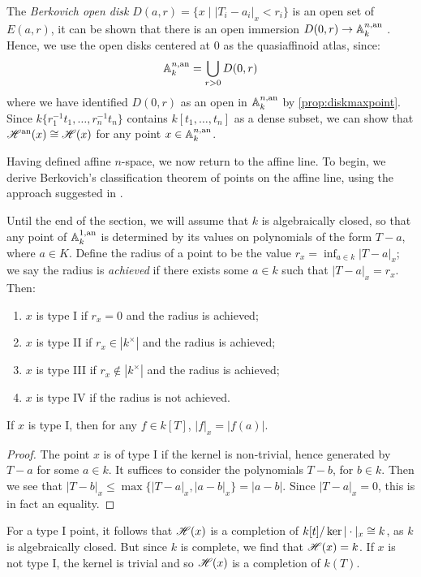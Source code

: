 The \textit{Berkovich open disk} $D(a, r) = \{x \; | \; |T_i - a_i|_x < r_i \}$ is an open set of $E(a, r)$, it can be shown that there is an open immersion $D(0, r) \to \mathbb{A}^{n, \text{an}}_{k}$ \parencite[Corollary 2.6.2]{berk1}.
Hence, we use the open disks centered at $0$ as the quasiaffinoid atlas, since:
\[
\mathbb{A}^{n, \text{an}}_{k} = \bigcup\limits_{r > 0} D(0, r)
\]
where we have identified $D(0, r)$ as an open in $\mathbb{A}^{n, \text{an}}_{k}$ by \cref{prop:diskmaxpoint}.
Since $k\{r_1^{-1} t_1, \dots, r_n^{-1} t_n\}$ contains $k[t_1, \dots, t_n]$ as a dense subset, we can show that $\mathscr{H}^{\text{an}}(x) \cong \mathscr{H}(x)$ for any point $x \in \mathbb{A}^{n, \text{an}}_{k}$.

Having defined affine $n$-space, we now return to the affine line. 
To begin, we derive Berkovich's classification theorem of points on the affine line, using the approach suggested in \parencite[Exercise 2.3.3.5]{temk}.

Until the end of the section, we will assume that $k$ is algebraically closed, so that any point of $\mathbb{A}^{1, \text{an}}_{k}$ is determined by its values on polynomials of the form $T - a$, where $a \in K$. Define the radius of a point to be the value $r_x = \inf_{a \in k} |T - a|_x$; we say the radius is \textit{achieved} if there exists some $a \in k$ such that $|T - a|_x = r_x$.
Then:
\begin{enumerate}
    \item $x$ is type I if $r_x = 0$ and the radius is achieved;
    \item $x$ is type II if $r_x \in |k^{\times}|$ and the radius is achieved;
    \item $x$ is type III if $r_x \not\in |k^{\times}|$ and the radius is achieved;
    \item $x$ is type IV if the radius is not achieved.
\end{enumerate}

\begin{prop}\label{typeIpoints}
    If $x$ is type I, then for any $f \in k[T]$, $|f|_x = |f(a)|$.
\end{prop}
\begin{proof}
    The point $x$ is of type I if the kernel is non-trivial, hence generated by $T - a$ for some $a \in k$. 
    It suffices to consider the polynomials $T - b$, for $b \in k$. Then
    we see that $|T - b|_x \leq \max \{ |T - a|_x, |a - b|_x \} = |a - b|$. Since $|T - a|_x = 0$, this is in fact an equality.
\end{proof}

For a type I point, it follows that $\mathscr{H}(x)$ is a completion of $k[t]/\ker |\cdot|_x \cong k$, as $k$ is algebraically closed. But since $k$ is complete, we find that $\mathscr{H}(x) = k$. If $x$ is not type I, the kernel is trivial and so $\mathscr{H}(x)$ is a completion of $k(T)$.

